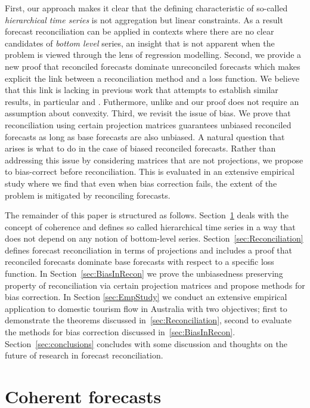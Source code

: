 \documentclass[12pt]{article}
\theoremstyle{definition}
\theoremstyle{property}
\begin{document}
	First, our approach makes it clear that the defining characteristic of so-called {\em hierarchical time series} is not aggregation but linear constraints.  As a result forecast reconciliation can be applied in contexts where there are no clear candidates of {\em bottom level} series, an insight that is not apparent when the problem is viewed through the lens of regression modelling.  Second, we provide a new proof that reconciled forecasts dominate unreconciled forecasts which makes explicit the link between a reconciliation method and a loss function.  We believe that this link is lacking in previous work that attempts to establish similar results, in particular \cite{VanErven2015a} and \cite{WicEtAl2019}.  Futhermore, unlike \cite{VanErven2015a} and \cite{WicEtAl2019} our proof does not require an assumption about convexity.  Third, we revisit the issue of bias.  We prove that reconciliation using certain projection matrices guarantees unbiased reconciled forecasts as long as base forecasts are also unbiased.  A natural question that arises is what to do in the case of biased reconciled forecasts.  Rather than addressing this issue by considering matrices that are not projections, we propose to bias-correct before reconciliation.  This is evaluated in an extensive empirical study where we find that even when bias correction fails, the extent of the problem is mitigated by reconciling forecasts.
	
	
	The remainder of this paper is structured as follows. Section~\ref{sec:CoheForecasts} deals with the concept of coherence and defines so called hierarchical time series in a way that does not depend on any notion of bottom-level series.  Section~\ref{sec:Reconciliation} defines forecast reconciliation in terms of projections and includes a proof that reconciled forecasts dominate base forecasts with respect to a specific loss function. In Section~\ref{sec:BiasInRecon} we prove the unbiasedness preserving property of reconciliation via certain projection matrices and propose methods for bias correction. In Section \ref{sec:EmpStudy} we conduct an extensive empirical application to domestic tourism flow in Australia with two objectives; first to demonstrate the theorems discussed in~\ref{sec:Reconciliation}, second to evaluate the methods for bias correction discussed in~\ref{sec:BiasInRecon}.  Section~\ref{sec:conclusions} concludes with some discussion and thoughts on the  future of research in forecast reconciliation.
\section{Coherent forecasts}\label{sec:CoheForecasts}
	
\end{document}
